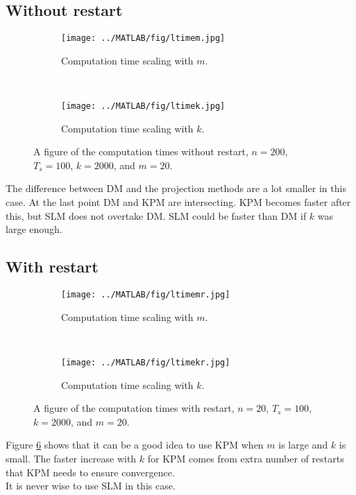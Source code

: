 \subsection{Without restart}
%
\begin{figure}[H]
        \centering
        \begin{subfigure}[b]{0.45\textwidth}
                \texttt{[image: ../MATLAB/fig/ltimem.jpg]}
                \caption{ Computation time scaling with $m$. }
                \label{fig:ltimem}
        \end{subfigure}
        ~
        \begin{subfigure}[b]{0.45\textwidth}
                \texttt{[image: ../MATLAB/fig/ltimek.jpg]}
                \caption{ Computation time scaling with $k$. }
                \label{fig:ltimek}
        \end{subfigure}
        \caption{ A figure of the computation times without restart, $n = 200$, $T_s = 100$, $k = 2000$, and $m = 20$. }
        \label{fig:ltime0}
\end{figure}
The difference between DM and the projection methods are a lot smaller in this case. At the last point DM and KPM are intersecting. KPM becomes faster after this, but SLM does not overtake DM. SLM could be faster than DM if $k$ was large enough.
\subsection{With restart}

\begin{figure}[H]
        \centering
        \begin{subfigure}[b]{0.45\textwidth}
                \texttt{[image: ../MATLAB/fig/ltimemr.jpg]}
                \caption{ Computation time scaling with $m$. }
                \label{fig:ltimemr}
        \end{subfigure}
        ~
        \begin{subfigure}[b]{0.45\textwidth}
                \texttt{[image: ../MATLAB/fig/ltimekr.jpg]}
                \caption{ Computation time scaling with $k$. }
                \label{fig:ltimekr}
        \end{subfigure}
        \caption{ A figure of the computation times with restart, $n = 20$, $T_s = 100$, $k = 2000$, and $m = 20$. }
        \label{fig:ltime1}
\end{figure}
Figure \ref{fig:ltime1} shows that it can be a good idea to use KPM when $m$ is large and $k$ is small. The faster increase with $k$ for KPM comes from extra number of restarts that KPM needs to ensure convergence. \\
It is never wise to use SLM in this case.
